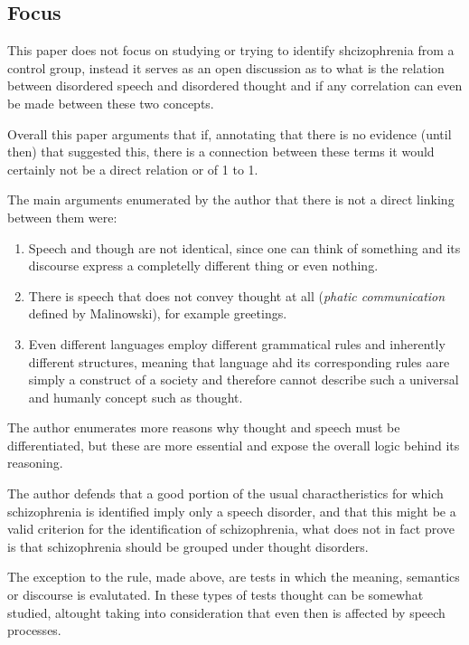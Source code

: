 \documentclass{Paper_Summary}
\begin{document}
\makepapertitle

\breakline

\begin{center}
    \section*{Focus}
\end{center}
    This paper does not focus on studying or trying to identify shcizophrenia from a control group, instead it serves as an open discussion as to what is the relation between disordered speech and disordered thought and if any correlation can even be made between these two concepts.

    Overall this paper arguments that if, annotating that there is no evidence (until then) that suggested this, there is a connection between these terms it would certainly not be a direct relation or of 1 to 1.

    The main arguments enumerated by the author that there is not a direct linking between them were:
    \begin{enumerate}
        \item Speech and though are not identical, since one can think of something and its discourse express a completelly different thing or even nothing.
        \item There is speech that does not convey thought at all (\emph{phatic communication} defined by Malinowski), for example greetings.
        \item Even different languages employ different grammatical rules and inherently different structures, meaning that language ahd its corresponding rules aare simply a construct of a society and therefore cannot describe such a universal and humanly concept such as thought.
    \end{enumerate}
    The author enumerates more reasons why thought and speech must be differentiated, but these are more essential and expose the overall logic behind its reasoning.

    The author defends that a good portion of the usual charactheristics for which schizophrenia is identified imply only a speech disorder, and that this might be a valid criterion for the identification of schizophrenia, what does not in fact prove is that schizophrenia should be grouped under thought disorders.
    
    The exception to the rule, made above, are tests in which the meaning, semantics or discourse is evalutated. In these types of tests thought can be somewhat studied, altought taking into consideration that even then is affected by speech processes.
\end{document}
